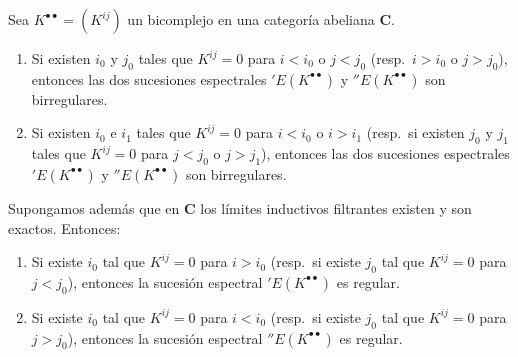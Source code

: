 \begin{proposition}[11.3.3]
\label{0.11.3.3}
\label{0.11.3.3-fr}
Sea $K^{\bullet\bullet}=(K^{ij})$ un bicomplejo en una categoría abeliana $\boldsymbol{C}$.
\begin{enumerate}
  \item[{\rm(i)}] Si existen $i_0$ y $j_0$ tales que $K^{ij}=0$ para $i<i_0$ o $j<j_0$ \textup{(resp.}~$i>i_0$ o $j>j_0$), entonces las dos sucesiones espectrales $'E(K^{\bullet\bullet})$ y $''E(K^{\bullet\bullet})$ son birregulares.
  \item[{\rm(ii)}] Si existen $i_0$ e $i_1$ tales que $K^{ij}=0$ para $i<i_0$ o $i>i_1$ \textup{(resp.}~si existen $j_0$ y $j_1$ tales que $K^{ij}=0$ para $j<j_0$ o $j>j_1$), entonces las dos sucesiones espectrales $'E(K^{\bullet\bullet})$ y $''E(K^{\bullet\bullet})$ son birregulares.
\end{enumerate}
Supongamos además que en $\boldsymbol{C}$ los límites inductivos filtrantes existen y son exactos. Entonces:
\begin{enumerate}
\item[\textup{(iii)}] Si existe $i_0$ tal que $K^{ij}=0$ para $i>i_0$ \textup{(resp.}~si existe $j_0$ tal que $K^{ij}=0$ para $j<j_0$), entonces la sucesión espectral $'E(K^{\bullet\bullet})$ es regular.
  \item[{\rm(iv)}] Si existe $i_0$ tal que $K^{ij}=0$ para $i<i_0$ \textup{(resp.}~si existe $j_0$ tal que $K^{ij}=0$ para $j>j_0$), entonces la sucesión espectral $''E(K^{\bullet\bullet})$ es regular.
\end{enumerate}
\end{proposition}

